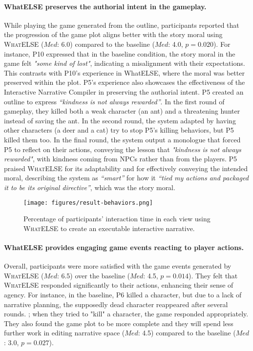 \paragraph{WhatELSE preserves the authorial intent in the gameplay. } While playing the game generated from the outline, participants reported that the progression of the game plot aligns better with the story moral using \textsc{WhatELSE} ($Med$: 6.0) compared to the baseline ($Med$: 4.0, $p = 0.020$). For instance, P10 expressed that in the baseline condition, the story moral in the game felt \textit{"some kind of lost"}, indicating a misalignment with their expectations. This contrasts with P10's experience in WhatELSE, where the moral was better preserved within the plot. P5's experience also showcases the effectiveness of the Interactive Narrative Compiler in preserving the authorial intent. P5 created an outline to express \textit{``kindness is not always rewarded''}. In the first round of gameplay, they killed both a weak character (an ant) and a threatening hunter instead of saving the ant. In the second round, the system adapted by having other characters (a deer and a cat) try to stop P5's killing behaviors, but P5 killed them too. In the final round, the system output a monologue that forced P5 to reflect on their actions, conveying the lesson that \textit{"kindness is not always rewarded"}, with kindness coming from NPCs rather than from the players. P5 praised \textsc{WhatELSE} for its adaptability and for effectively conveying the intended moral, describing the system as \textit{``smart''} for how it \textit{``tied my actions and packaged it to be its original directive''}, which was the story moral. 


\begin{figure}
    \centering
    \texttt{[image: figures/result-behaviors.png]}
    \caption{Percentage of participants' interaction time in each view using \textsc{WhatELSE} to create an executable interactive narrative.}
    \label{fig:behaviors}
    \Description{}
\end{figure}


\paragraph{WhatELSE provides engaging game events reacting to player actions. } Overall, participants were more satisfied with the game events generated by \textsc{WhatELSE} ($Med$: 6.5) over the baseline ($Med$: 4.5, $p = 0.014$). They felt that \textsc{WhatELSE} responded significantly to their actions, enhancing their sense of agency. For instance, in the baseline, P6 killed a character, but due to a lack of narrative planning, the supposedly dead character reappeared after several rounds. ; when they tried to "kill" a character, the game responded appropriately. They also found the game plot to be more complete and they will spend less further work in editing narrative space ($Med$: 4.5) compared to the baseline ($Med$: 3.0, $p = 0.027$). 




